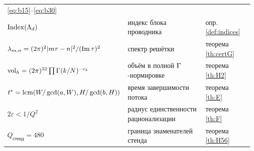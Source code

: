 \begin{center}
\begin{longtable}{@{}p{3.2cm} p{8.2cm} p{2.6cm}@{}}
\eqref{eq:b15}--\eqref{eq:b30} \\
$\operatorname{Index}(\Lambda_d)$ & индекс блока проводника & опр. \ref{def:indices} \\
$\lambda_{m,n}=(2\pi)^2|m\tau-n|^2/(\operatorname{Im}\tau)^2$ & спектр решётки &
теорема \ref{th:certG} \\
$\mathrm{vol}_h=(2\pi)^{32}\prod\Gamma(k/N)^{-c_k}$ & объём в полной
$\Gamma$-нормировке & теорема \ref{th:H2} \\
$t^*=\operatorname{lcm}(W/\gcd(a,W),H/\gcd(b,H))$ & время завершимости потока &
теорема \ref{th:E} \\
$2\varepsilon<1/Q^2$ & радиус единственности рационализации &
теорема \ref{th:F} \\
$Q_{\text{стенд}}=480$ & граница знаменателей стенда &
теорема \ref{th:H56} \\
\end{longtable}
\end{center}
